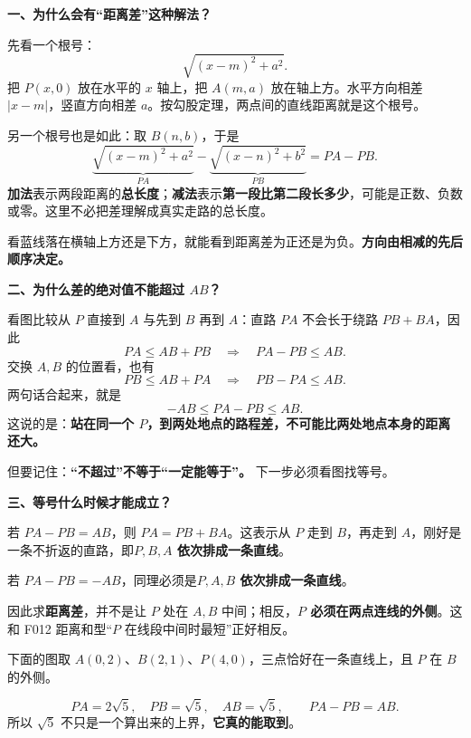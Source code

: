 \clearpage
\begin{explanationbox}
	\textbf{\textcolor{CExplanation}{一、为什么会有“距离差”这种解法？}}



	先看一个根号：
	\[
		\sqrt{(x-m)^2+a^2}.
	\]
	把 $P(x,0)$ 放在水平的 $x$ 轴上，把 $A(m,a)$ 放在轴上方。水平方向相差 $|x-m|$，竖直方向相差 $a$。按勾股定理，两点间的直线距离就是这个根号。

	另一个根号也是如此：取 $B(n,b)$，于是
	\[
		\underbrace{\sqrt{(x-m)^2+a^2}}_{PA}
		-\underbrace{\sqrt{(x-n)^2+b^2}}_{PB}
		=PA-PB.
	\]
	\textbf{加法}表示两段距离的\textbf{总长度}；\textbf{减法}表示\textbf{第一段比第二段长多少}，可能是正数、负数或零。这里不必把差理解成真实走路的总长度。

	看蓝线落在横轴上方还是下方，就能看到距离差为正还是为负。\textbf{方向由相减的先后顺序决定。}

	\medskip
\end{explanationbox}
\clearpage
\begin{explanationbox}
	\textbf{\textcolor{CExplanation}{二、为什么差的绝对值不能超过 $AB$？}}



	看图比较从 $P$ 直接到 $A$ 与先到 $B$ 再到 $A$：直路 $PA$ 不会长于绕路 $PB+BA$，因此
	\[
		PA\leq AB+PB\quad\Longrightarrow\quad PA-PB\leq AB.
	\]
	交换 $A,B$ 的位置看，也有
	\[
		PB\leq AB+PA\quad\Longrightarrow\quad PB-PA\leq AB.
	\]
	两句话合起来，就是
	\[
		\boxed{-AB\leq PA-PB\leq AB}.
	\]
	这说的是：\textbf{站在同一个 $P$，到两处地点的路程差，不可能比两处地点本身的距离还大。}

	但要记住：\textbf{“不超过”不等于“一定能等于”。} 下一步必须看图找等号。
\end{explanationbox}
\clearpage
\begin{explanationbox}
	\textbf{\textcolor{CExplanation}{三、等号什么时候才能成立？}}

	若 $PA-PB=AB$，则 $PA=PB+BA$。这表示从 $P$ 走到 $B$，再走到 $A$，刚好是一条不折返的直路，即\textbf{$P,B,A$ 依次排成一条直线}。

	若 $PA-PB=-AB$，同理必须是\textbf{$P,A,B$ 依次排成一条直线}。

	因此求\textbf{距离差}，并不是让 $P$ 处在 $A,B$ 中间；相反，\textbf{$P$ 必须在两点连线的外侧}。这和 F012 距离和型“$P$ 在线段中间时最短”正好相反。

	下面的图取 $A(0,2)$、$B(2,1)$、$P(4,0)$，三点恰好在一条直线上，且 $P$ 在 $B$ 的外侧。
	
	\[
		PA=2\sqrt5,\quad PB=\sqrt5,\quad AB=\sqrt5,
		\qquad PA-PB=AB.
	\]
	所以 $\sqrt5$ 不只是一个算出来的上界，\textbf{它真的能取到}。
\end{explanationbox}
